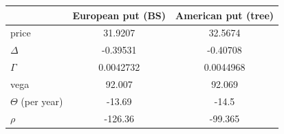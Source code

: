 \begin{tabular}{lcc}
\toprule
 & European put (BS) & American put (tree) \\
\midrule
price & 31.9207 & 32.5674 \\
$\Delta$ & -0.39531 & -0.40708 \\
$\Gamma$ & 0.0042732 & 0.0044968 \\
vega & 92.007 & 92.069 \\
$\Theta$ (per year) & -13.69 & -14.5 \\
$\rho$ & -126.36 & -99.365 \\
\bottomrule
\end{tabular}
